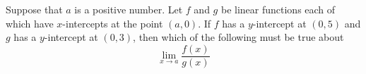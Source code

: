 \documentclass{ximera}
\author{Bobby Ramsey}
\begin{document}
\begin{exercise}	
	Suppose that $a$ is a positive number.  Let $f$ and $g$ be linear functions each of 
	which have $x$-intercepts at the point $(a,0)$.  If $f$ has a $y$-intercept at $(0,5)$ and 
	$g$ has a $y$-intercept at $(0,3)$, then which of the following must be true about
	\[ \lim_{x\to a} \frac{f(x)}{g(x)}  \]
	
	\begin{multipleChoice}
	\end{multipleChoice}
	
\end{exercise}
\end{document}
